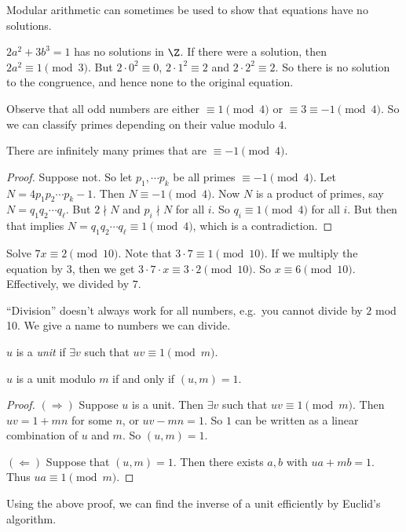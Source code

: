 \documentclass[a4paper]{article}
\begin{document}
Modular arithmetic can sometimes be used to show that equations have no solutions.
\begin{eg}
  $2a^2 + 3b^3 = 1$ has no solutions in $\Z$. If there were a solution, then $2a^2 \equiv 1\pmod 3$. But $2\cdot 0^2 \equiv 0$, $2\cdot 1^2\equiv 2$ and $2\cdot 2^2 \equiv 2$. So there is no solution to the congruence, and hence none to the original equation.
\end{eg}

Observe that all odd numbers are either $\equiv 1\pmod 4$ or $\equiv 3\equiv -1\pmod 4$. So we can classify primes depending on their value modulo $4$.

\begin{thm}
  There are infinitely many primes that are $\equiv -1 \pmod 4$.
\end{thm}

\begin{proof}
  Suppose not. So let $p_1, \cdots p_k$ be all primes $\equiv -1 \pmod 4$. Let $N = 4p_1p_2\cdots p_k - 1$. Then $N\equiv -1\pmod 4$. Now $N$ is a product of primes, say $N= q_1q_2\cdots q_\ell$. But $2\nmid N$ and $p_i\nmid N$ for all $i$. So $q_i \equiv 1\pmod 4$ for all $i$. But then that implies $N = q_1q_2\cdots q_\ell \equiv 1\pmod 4$, which is a contradiction.
\end{proof}

\begin{eg}
  Solve $7x \equiv 2 \pmod {10}$. Note that $3\cdot 7\equiv 1\pmod {10}$. If we multiply the equation by $3$, then we get $3\cdot 7\cdot x \equiv 3\cdot 2\pmod {10}$. So $x\equiv 6\pmod {10}$. Effectively, we divided by $7$.
\end{eg}
``Division'' doesn't always work for all numbers, e.g.\ you cannot divide by $2$ mod 10. We give a name to numbers we can divide.

\begin{defi}
  $u$ is a \emph{unit} if $\exists v$ such that $uv \equiv 1\pmod m$.
\end{defi}

\begin{thm}
  $u$ is a unit modulo $m$ if and only if $(u, m) = 1$.
\end{thm}

\begin{proof}
  $(\Rightarrow)$ Suppose $u$ is a unit. Then $\exists v$ such that $uv \equiv 1\pmod m$. Then $uv = 1 + mn$ for some $n$, or $uv - mn = 1$. So $1$ can be written as a linear combination of $u$ and $m$. So $(u, m) = 1$.

  $(\Leftarrow)$ Suppose that $(u, m) = 1$. Then there exists $a, b$ with $ua + mb = 1$. Thus $ua \equiv 1\pmod m$.
\end{proof}
Using the above proof, we can find the inverse of a unit efficiently by Euclid's algorithm.
\end{document}
